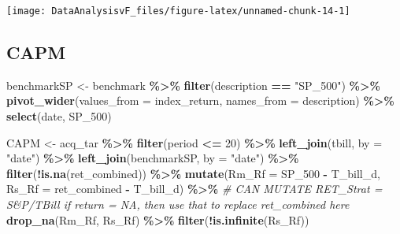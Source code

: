 \documentclass[
]{article}
\newenvironment{Shaded}{\begin{snugshade}}{\end{snugshade}}
\newcommand{\CommentTok}[1]{\textcolor[rgb]{0.56,0.35,0.01}{\textit{#1}}}
\newcommand{\DataTypeTok}[1]{\textcolor[rgb]{0.13,0.29,0.53}{#1}}
\newcommand{\DecValTok}[1]{\textcolor[rgb]{0.00,0.00,0.81}{#1}}
\newcommand{\KeywordTok}[1]{\textcolor[rgb]{0.13,0.29,0.53}{\textbf{#1}}}
\newcommand{\NormalTok}[1]{#1}
\newcommand{\OperatorTok}[1]{\textcolor[rgb]{0.81,0.36,0.00}{\textbf{#1}}}
\newcommand{\StringTok}[1]{\textcolor[rgb]{0.31,0.60,0.02}{#1}}
\begin{document}
\begin{center}\texttt{[image: DataAnalysisvF\_files/figure-latex/unnamed-chunk-14-1]} \end{center}

\hypertarget{capm}{%
\subsection{CAPM}\label{capm}}

\begin{Shaded}
\begin{Highlighting}[]
\NormalTok{benchmarkSP \textless{}{-}}\StringTok{ }\NormalTok{benchmark }\OperatorTok{\%\textgreater{}\%}
\StringTok{  }\KeywordTok{filter}\NormalTok{(description }\OperatorTok{==}\StringTok{ "SP\_500"}\NormalTok{) }\OperatorTok{\%\textgreater{}\%}
\StringTok{  }\KeywordTok{pivot\_wider}\NormalTok{(}\DataTypeTok{values\_from =}\NormalTok{ index\_return, }\DataTypeTok{names\_from =}\NormalTok{ description) }\OperatorTok{\%\textgreater{}\%}
\StringTok{  }\KeywordTok{select}\NormalTok{(date, SP\_}\DecValTok{500}\NormalTok{)}


\NormalTok{CAPM \textless{}{-}}\StringTok{ }\NormalTok{acq\_tar }\OperatorTok{\%\textgreater{}\%}
\StringTok{  }\KeywordTok{filter}\NormalTok{(period }\OperatorTok{\textless{}=}\StringTok{ }\DecValTok{20}\NormalTok{) }\OperatorTok{\%\textgreater{}\%}\StringTok{ }
\StringTok{  }\KeywordTok{left\_join}\NormalTok{(tbill, }\DataTypeTok{by =} \StringTok{"date"}\NormalTok{) }\OperatorTok{\%\textgreater{}\%}
\StringTok{  }\KeywordTok{left\_join}\NormalTok{(benchmarkSP, }\DataTypeTok{by =} \StringTok{"date"}\NormalTok{) }\OperatorTok{\%\textgreater{}\%}\StringTok{ }
\StringTok{  }\KeywordTok{filter}\NormalTok{(}\OperatorTok{!}\KeywordTok{is.na}\NormalTok{(ret\_combined)) }\OperatorTok{\%\textgreater{}\%}\StringTok{ }
\StringTok{  }\KeywordTok{mutate}\NormalTok{(}\DataTypeTok{Rm\_Rf =}\NormalTok{ SP\_}\DecValTok{500} \OperatorTok{{-}}\StringTok{ }\NormalTok{T\_bill\_d,}
         \DataTypeTok{Rs\_Rf =}\NormalTok{ ret\_combined }\OperatorTok{{-}}\StringTok{ }\NormalTok{T\_bill\_d) }\OperatorTok{\%\textgreater{}\%}\StringTok{  }\CommentTok{\# CAN MUTATE RET\_Strat = S\&P/TBill if return = NA, then use that to replace ret\_combined here}
\StringTok{  }\KeywordTok{drop\_na}\NormalTok{(Rm\_Rf, Rs\_Rf) }\OperatorTok{\%\textgreater{}\%}
\StringTok{  }\KeywordTok{filter}\NormalTok{(}\OperatorTok{!}\KeywordTok{is.infinite}\NormalTok{(Rs\_Rf))}


\end{Highlighting}
\end{Shaded}
\end{document}
